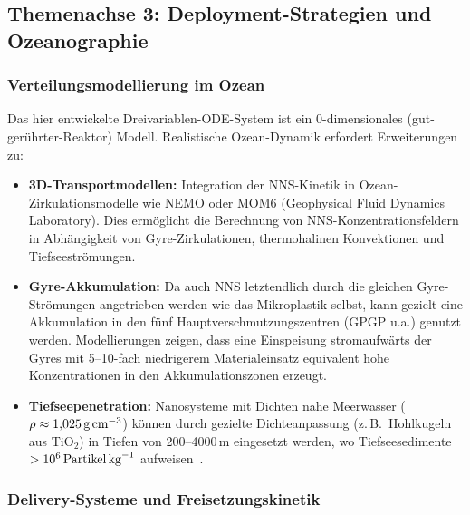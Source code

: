 ﻿\documentclass[12pt,a4paper]{article}
\theoremstyle{definition}
\theoremstyle{remark}
\begin{document}
\subsection{Themenachse 3: Deployment-Strategien und Ozeanographie}

\subsubsection{Verteilungsmodellierung im Ozean}

Das hier entwickelte Dreivariablen-ODE-System ist ein 0-dimensionales
(gut-gerührter-Reaktor) Modell. Realistische Ozean-Dynamik erfordert
Erweiterungen zu:

\begin{itemize}
  \item \textbf{3D-Transportmodellen:} Integration der NNS-Kinetik in
        Ozean-Zirkulationsmodelle wie NEMO oder MOM6 (Geophysical Fluid
        Dynamics Laboratory). Dies ermöglicht die Berechnung von
        NNS-Konzentrationsfeldern in Abhängigkeit von Gyre-Zirkulationen,
        thermohalinen Konvektionen und Tiefseeströmungen.
  \item \textbf{Gyre-Akkumulation:} Da auch NNS letztendlich durch die gleichen
        Gyre-Strömungen angetrieben werden wie das Mikroplastik selbst,
        kann gezielt eine Akkumulation in den fünf Hauptverschmutzungszentren
        (GPGP u.a.) genutzt werden. Modellierungen zeigen, dass eine
        Einspeisung stromaufwärts der Gyres mit 5--10-fach niedrigerem
        Materialeinsatz equivalent hohe Konzentrationen in den Akkumulationszonen
        erzeugt.
  \item \textbf{Tiefseepenetration:} Nano\-systeme mit Dichten nahe Meerwasser
        ($\rho \approx 1{,}025\,\text{g\,cm}^{-3}$) können durch gezielte
        Dichteanpassung (z.\,B.\ Hohlkugeln aus TiO$_2$) in Tiefen von
        200--4000\,m eingesetzt werden, wo Tiefseesedimente
        $> 10^6\,\text{Partikel\,kg}^{-1}$ aufweisen~\cite{peng2018microplastics}.
\end{itemize}

\subsubsection{Delivery-Systeme und Freisetzungskinetik}
\end{document}
